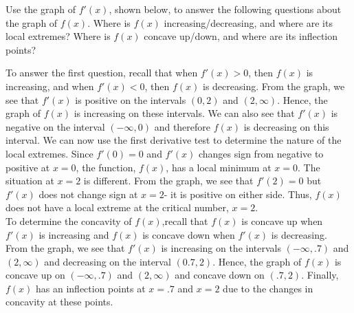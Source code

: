 \documentclass[handout]{ximera}
\begin{document}
\begin{example}[example 10]
Use the graph of $f'(x)$, shown below, to answer the following questions about the graph of $f(x)$.
Where is $f(x)$ increasing/decreasing, and where are its local extremes?
Where is $f(x)$ concave up/down, and where are its inflection points?

\begin{image}
\end{image}

To answer the first question, recall that when $f'(x) > 0$, then $f(x)$ is increasing,
and when $f'(x) < 0$, then $f(x)$ is decreasing.  From the graph, we see 
that $f'(x)$ is positive on the intervals 
$(0, 2)$ and $(2, \infty)$.  Hence, the graph of $f(x)$ is increasing on 
these intervals. We can also see that 
$f'(x)$ is negative on the interval $(-\infty, 0)$ and therefore $f(x)$ is 
decreasing on this interval.
We can now use the first derivative test to determine the nature of the local extremes. 
Since $f'(0) = 0$ and $f'(x)$
changes sign from negative to positive at $x = 0$, the function, $f(x)$, has a 
local minimum at $x = 0$.
The situation at $x = 2$ is different. From the graph, we see that $f'(2) = 0$ 
but $f'(x)$ does not change sign at $x = 2$- 
it is positive on either side. Thus, $f(x)$ does not have a local extreme at the 
critical number, $x = 2$.\\
To determine the concavity of $f(x)$,recall that $f(x)$ is concave up when $f'(x)$ is 
increasing and $f(x)$
is concave down when $f'(x)$ is decreasing.  From the graph, we see that $f'(x)$ is 
increasing on the intervals $(-\infty, .7)$
and $(2, \infty)$ and decreasing on the interval $(0.7, 2)$. Hence, the 
graph of $f(x)$ is concave up on $(-\infty, .7)$ and $(2, \infty)$
and concave down on $(.7, 2)$.  Finally, $f(x)$ has an inflection 
points at $x = .7$ and $x = 2$ due to the changes in concavity at these points.


\end{example}
\end{document}
